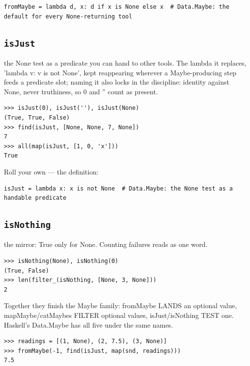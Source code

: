 \documentclass[10pt,letterpaper]{book}
\begin{document}
\begin{lstlisting}[style=ex]
fromMaybe = lambda d, x: d if x is None else x  # Data.Maybe: the default for every None-returning tool
\end{lstlisting}

\subsection{\texttt{isJust}}\label{def:isJust}
the None test as a predicate you can hand to other tools. The lambda it replaces, 'lambda v: v is not None', kept reappearing wherever a Maybe-producing step feeds a predicate slot; naming it also locks in the discipline: identity against None, never truthiness, so 0 and '' count as present.
\begin{lstlisting}[style=ex]
>>> isJust(0), isJust(''), isJust(None)
(True, True, False)
>>> find(isJust, [None, None, 7, None])
7
>>> all(map(isJust, [1, 0, 'x']))
True
\end{lstlisting}

Roll your own --- the definition:

\begin{lstlisting}[style=ex]
isJust = lambda x: x is not None  # Data.Maybe: the None test as a handable predicate
\end{lstlisting}

\subsection{\texttt{isNothing}}\label{def:isNothing}
the mirror: True only for None. Counting failures reads as one word.
\begin{lstlisting}[style=ex]
>>> isNothing(None), isNothing(0)
(True, False)
>>> len(filter_(isNothing, [None, 3, None]))
2
\end{lstlisting}

Together they finish the Maybe family: fromMaybe LANDS an optional value, mapMaybe/catMaybes FILTER optional values, isJust/isNothing TEST one. Haskell's Data.Maybe has all five under the same names.

\begin{lstlisting}[style=ex]
>>> readings = [(1, None), (2, 7.5), (3, None)]
>>> fromMaybe(-1, find(isJust, map(snd, readings)))
7.5
\end{lstlisting}
\end{document}
